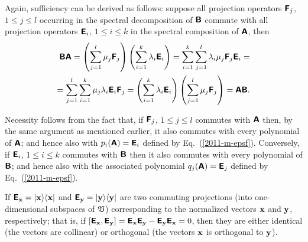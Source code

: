 {\color{OliveGreen}\bproof
Again, sufficiency can be derived as follows: suppose all projection operators $\textsf{\textbf{F}}_j$, $1\le j\le l$
occurring in the spectral decomposition of $\textsf{\textbf{B}}$
commute with all projection operators $\textsf{\textbf{E}}_i$, $1\le i\le k$
in the spectral composition of   $\textsf{\textbf{A}}$,
then
\begin{equation}
\begin{split}
 \textsf{\textbf{B}}\textsf{\textbf{A}}
=
\left(\sum_{j=1}^l \mu_j\textsf{\textbf{F}}_j\right) \left(\sum_{i=1}^k \lambda_i \textsf{\textbf{E}}_i\right)
=
\sum_{i=1}^k \sum_{j=1}^l \lambda_i \mu_j \textsf{\textbf{F}}_j\textsf{\textbf{E}}_i
=
\\
=
\sum_{j=1}^l \sum_{i=1}^k \mu_j \lambda_i \textsf{\textbf{E}}_i \textsf{\textbf{F}}_j
=
\left(\sum_{i=1}^k \lambda_i \textsf{\textbf{E}}_i \right)  \left(\sum_{j=1}^l \mu_j \textsf{\textbf{F}}_j\right)
=\textsf{\textbf{A}} \textsf{\textbf{B}}
.
\end{split}
\end{equation}


Necessity follows from the fact that, if $\textsf{\textbf{F}}_j$, $1\le j\le l$
commutes with  $\textsf{\textbf{A}}$
then, by the same argument as mentioned earlier,
it also commutes with every polynomial of  $\textsf{\textbf{A}}$;
and
hence also with $p_i(\textsf{\textbf{A}})=\textsf{\textbf{E}}_i$ defined by Eq.~(\ref{2011-m-epsf}).
Conversely,
if $\textsf{\textbf{E}}_i$, $1\le i\le k$
commutes with  $\textsf{\textbf{B}}$
then it also commutes with every polynomial of  $\textsf{\textbf{B}}$;
and
hence also with the associated polynomial
$q_j(\textsf{\textbf{A}})=\textsf{\textbf{E}}_j$ defined by Eq.~(\ref{2011-m-epsf}).
\eproof
}



If
$\textsf{\textbf{E}}_{\bf x} = \vert {\bf x} \rangle \langle {\bf x} \vert$
and
$\textsf{\textbf{E}}_{\bf y} = \vert {\bf y} \rangle \langle {\bf y} \vert$
are two commuting projections (into one-dimensional subspaces of ${\frak V}$)
corresponding to the normalized vectors ${\bf x}$  and ${\bf y}$,
respectively; that is, if
$\left[
\textsf{\textbf{E}}_{\bf x}
,
\textsf{\textbf{E}}_{\bf y}
\right]=
\textsf{\textbf{E}}_{\bf x}
\textsf{\textbf{E}}_{\bf y}
-
\textsf{\textbf{E}}_{\bf y}
\textsf{\textbf{E}}_{\bf x}
=0$,
then they are either identical (the vectors are collinear) or orthogonal (the vectors ${\bf x}$ is orthogonal to ${\bf y}$).


